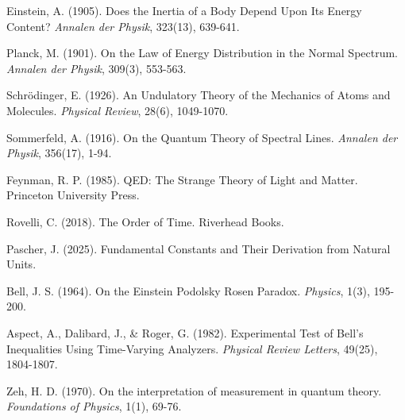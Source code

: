 \documentclass{article}
\begin{document}
	\begin{thebibliography}{9}
		
		 Einstein, A. (1905). Does the Inertia of a Body Depend Upon Its Energy Content? \textit{Annalen der Physik}, 323(13), 639-641.
		
		 Planck, M. (1901). On the Law of Energy Distribution in the Normal Spectrum. \textit{Annalen der Physik}, 309(3), 553-563.
		
		 Schrödinger, E. (1926). An Undulatory Theory of the Mechanics of Atoms and Molecules. \textit{Physical Review}, 28(6), 1049-1070.
		
		 Sommerfeld, A. (1916). On the Quantum Theory of Spectral Lines. \textit{Annalen der Physik}, 356(17), 1-94.
		
		 Feynman, R. P. (1985). QED: The Strange Theory of Light and Matter. Princeton University Press.
		
		 Rovelli, C. (2018). The Order of Time. Riverhead Books.
		
		 Pascher, J. (2025). Fundamental Constants and Their Derivation from Natural Units.
		
		 Bell, J. S. (1964). On the Einstein Podolsky Rosen Paradox. \textit{Physics}, 1(3), 195-200.
		
		 Aspect, A., Dalibard, J., \& Roger, G. (1982). Experimental Test of Bell's Inequalities Using Time-Varying Analyzers. \textit{Physical Review Letters}, 49(25), 1804-1807.
		
		 Zeh, H. D. (1970). On the interpretation of measurement in quantum theory. \textit{Foundations of Physics}, 1(1), 69-76.
		
	\end{thebibliography}
	
\end{document}

